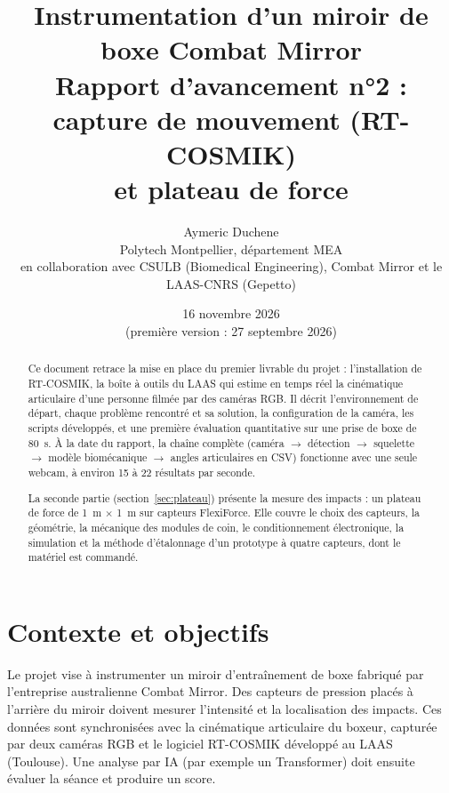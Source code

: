 \documentclass[11pt,a4paper]{article}
\title{\vspace{-1cm}
  \textbf{Instrumentation d'un miroir de boxe Combat Mirror}\\[4pt]
  \large Rapport d'avancement n°2 : capture de mouvement (RT-COSMIK)\\ et plateau de force}
\author{Aymeric Duchene\\ \small Polytech Montpellier, département MEA\\
  \small en collaboration avec CSULB (Biomedical Engineering), Combat Mirror et le LAAS-CNRS (Gepetto)}
\date{16 novembre 2026\\ \small (première version : 27 septembre 2026)}
\begin{document}
\maketitle
\thispagestyle{fancy}

\begin{abstract}
Ce document retrace la mise en place du premier livrable du projet : l'installation de RT-COSMIK, la boîte à outils du LAAS qui estime en temps réel la cinématique articulaire d'une personne filmée par des caméras RGB. Il décrit l'environnement de départ, chaque problème rencontré et sa solution, la configuration de la caméra, les scripts développés, et une première évaluation quantitative sur une prise de boxe de 80~s. À la date du rapport, la chaîne complète (caméra $\rightarrow$ détection $\rightarrow$ squelette $\rightarrow$ modèle biomécanique $\rightarrow$ angles articulaires en CSV) fonctionne avec une seule webcam, à environ 15 à 22 résultats par seconde.

La seconde partie (section~\ref{sec:plateau}) présente la mesure des impacts : un plateau de force de 1~m $\times$ 1~m sur capteurs FlexiForce. Elle couvre le choix des capteurs, la géométrie, la mécanique des modules de coin, le conditionnement électronique, la simulation et la méthode d'étalonnage d'un prototype à quatre capteurs, dont le matériel est commandé.
\end{abstract}

\tableofcontents
\newpage

\section{Contexte et objectifs}

Le projet vise à instrumenter un miroir d'entraînement de boxe fabriqué par l'entreprise australienne Combat Mirror. Des capteurs de pression placés à l'arrière du miroir doivent mesurer l'intensité et la localisation des impacts. Ces données sont synchronisées avec la cinématique articulaire du boxeur, capturée par deux caméras RGB et le logiciel RT-COSMIK développé au LAAS (Toulouse). Une analyse par IA (par exemple un Transformer) doit ensuite évaluer la séance et produire un score.
\end{document}
